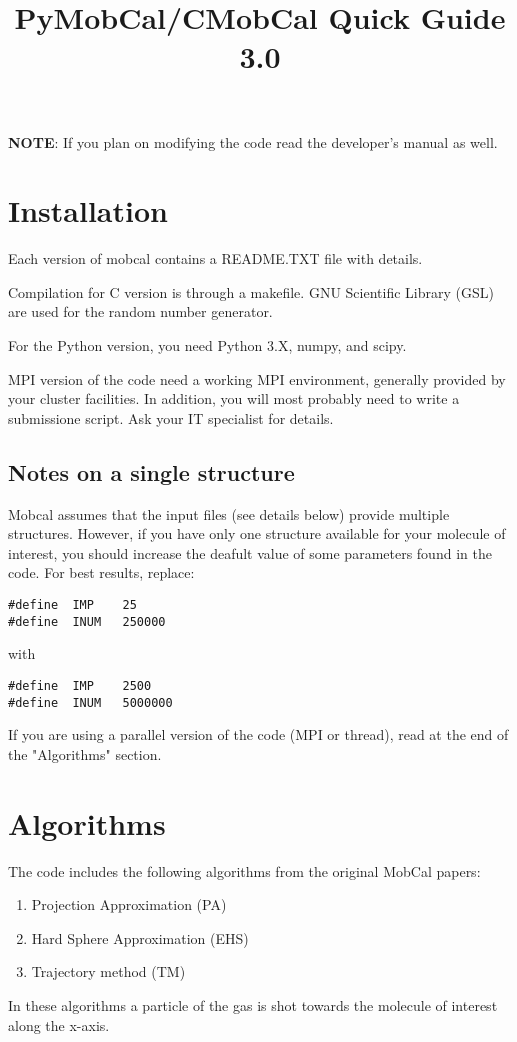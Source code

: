 \documentclass[letter,12pt]{article}
\begin{document}
\title{PyMobCal/CMobCal Quick Guide 3.0} 
\maketitle

\textbf{NOTE}: If you plan on modifying the code read the developer's manual as well.
\section{Installation}
Each version of mobcal contains a README.TXT file with details. 

Compilation for C version is through a makefile. GNU Scientific Library (GSL) are used for the random number generator.

For the Python version, you need Python 3.X, numpy, and scipy.

MPI version of the code need a working MPI environment, generally provided by your cluster facilities.
In addition, you will most probably need to write a submissione script.
Ask your IT specialist for details.

\subsection{Notes on a single structure}
Mobcal assumes that the input files (see details below) provide multiple structures. However, if you have only one 
structure available for your molecule of interest, you should increase the deafult value of some parameters found
in the code.
For best results, replace: 
\begin{verbatim}
#define  IMP    25
#define  INUM   250000
\end{verbatim}
with
\begin{verbatim}
#define  IMP    2500
#define  INUM   5000000
\end{verbatim}
If you are using a parallel version of the code (MPI or thread), read at the end of the "Algorithms" section.


\section{Algorithms}
The code includes the following algorithms from the original MobCal papers\cite{mobcal1,mobcal2}:
\begin{enumerate}
    \item Projection Approximation (PA)
    \item Hard Sphere Approximation (EHS)
    \item Trajectory method (TM)
\end{enumerate}
In these algorithms a particle of the gas is shot towards the molecule of interest along the x-axis. 
\end{document}
